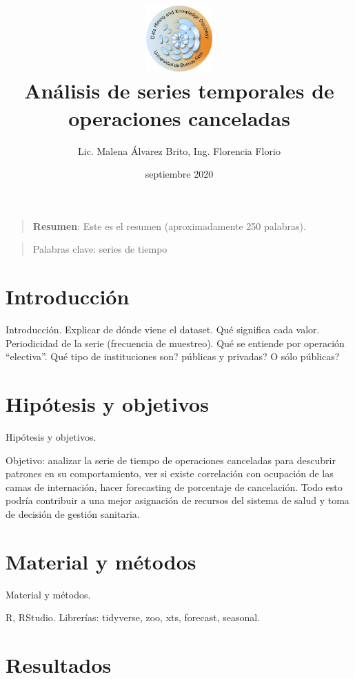 \documentclass[
]{article}
\title{\includegraphics[width=1in,height=\textheight]{logo_dm_uba.png}\\
Análisis de series temporales de operaciones canceladas}
\author{Lic. Malena Álvarez Brito, Ing. Florencia Florio}
\date{septiembre 2020}
\begin{document}
\maketitle

\begin{quote}
\textbf{Resumen}: Este es el resumen (aproximadamente 250 palabras).
\end{quote}

\begin{quote}
Palabras clave: series de tiempo
\end{quote}

\hypertarget{introducciuxf3n}{%
\section{Introducción}\label{introducciuxf3n}}

Introducción. Explicar de dónde viene el dataset. Qué significa cada
valor. Periodicidad de la serie (frecuencia de muestreo). Qué se
entiende por operación ``electiva''. Qué tipo de instituciones son?
públicas y privadas? O sólo públicas?

\hypertarget{hipuxf3tesis-y-objetivos}{%
\section{Hipótesis y objetivos}\label{hipuxf3tesis-y-objetivos}}

Hipótesis y objetivos.

Objetivo: analizar la serie de tiempo de operaciones canceladas para
descubrir patrones en su comportamiento, ver si existe correlación con
ocupación de las camas de internación, hacer forecasting de porcentaje
de cancelación. Todo esto podría contribuir a una mejor asignación de
recursos del sistema de salud y toma de decisión de gestión sanitaria.

\hypertarget{material-y-muxe9todos}{%
\section{Material y métodos}\label{material-y-muxe9todos}}

Material y métodos.

R, RStudio. Librerías: tidyverse, zoo, xts, forecast, seasonal.

\hypertarget{resultados}{%
\section{Resultados}\label{resultados}}
\end{document}
